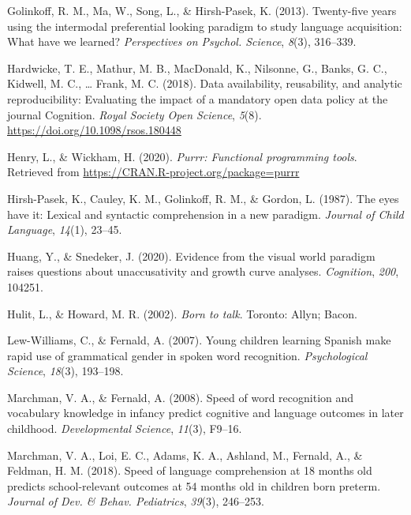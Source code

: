\documentclass[
  english,
  man,floatsintext]{apa6}
\begin{document}
\leavevmode\hypertarget{ref-Golinkoff2013}{}%
Golinkoff, R. M., Ma, W., Song, L., \& Hirsh-Pasek, K. (2013). Twenty-five years using the intermodal preferential looking paradigm to study language acquisition: What have we learned? \emph{Perspectives on Psychol. Science}, \emph{8}(3), 316--339.

\leavevmode\hypertarget{ref-Hardwicke2018}{}%
Hardwicke, T. E., Mathur, M. B., MacDonald, K., Nilsonne, G., Banks, G. C., Kidwell, M. C., \ldots{} Frank, M. C. (2018). Data availability, reusability, and analytic reproducibility: Evaluating the impact of a mandatory open data policy at the journal Cognition. \emph{Royal Society Open Science}, \emph{5}(8). \url{https://doi.org/10.1098/rsos.180448}

\leavevmode\hypertarget{ref-R-purrr}{}%
Henry, L., \& Wickham, H. (2020). \emph{Purrr: Functional programming tools}. Retrieved from \url{https://CRAN.R-project.org/package=purrr}

\leavevmode\hypertarget{ref-Hirsh-Pasek1987}{}%
Hirsh-Pasek, K., Cauley, K. M., Golinkoff, R. M., \& Gordon, L. (1987). The eyes have it: Lexical and syntactic comprehension in a new paradigm. \emph{Journal of Child Language}, \emph{14}(1), 23--45.

\leavevmode\hypertarget{ref-Huang2020}{}%
Huang, Y., \& Snedeker, J. (2020). Evidence from the visual world paradigm raises questions about unaccusativity and growth curve analyses. \emph{Cognition}, \emph{200}, 104251.

\leavevmode\hypertarget{ref-hulit2002}{}%
Hulit, L., \& Howard, M. R. (2002). \emph{Born to talk}. Toronto: Allyn; Bacon.

\leavevmode\hypertarget{ref-Lew-Williams2007}{}%
Lew-Williams, C., \& Fernald, A. (2007). Young children learning Spanish make rapid use of grammatical gender in spoken word recognition. \emph{Psychological Science}, \emph{18}(3), 193--198.

\leavevmode\hypertarget{ref-Marchman2008}{}%
Marchman, V. A., \& Fernald, A. (2008). Speed of word recognition and vocabulary knowledge in infancy predict cognitive and language outcomes in later childhood. \emph{Developmental Science}, \emph{11}(3), F9--16.

\leavevmode\hypertarget{ref-Marchman2018}{}%
Marchman, V. A., Loi, E. C., Adams, K. A., Ashland, M., Fernald, A., \& Feldman, H. M. (2018). Speed of language comprehension at 18 months old predicts school-relevant outcomes at 54 months old in children born preterm. \emph{Journal of Dev. \& Behav. Pediatrics}, \emph{39}(3), 246--253.
\end{document}
